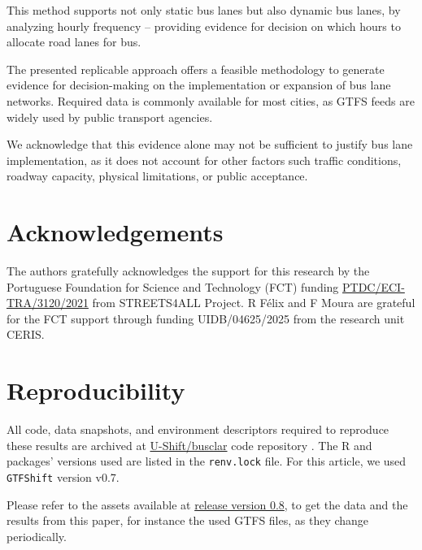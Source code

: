 \documentclass[
]{article}
\begin{document}
This method supports not only static bus lanes but also dynamic bus lanes, by analyzing hourly frequency -- providing evidence for decision on which hours to allocate road lanes for bus.

The presented replicable approach offers a feasible methodology to generate evidence for decision-making on the implementation or expansion of bus lane networks.
Required data is commonly available for most cities, as GTFS feeds are widely used by public transport agencies.

We acknowledge that this evidence alone may not be sufficient to justify bus lane implementation, as it does not account for other factors such traffic conditions, roadway capacity, physical limitations, or public acceptance.

\section*{Acknowledgements}\label{acknowledgements}

The authors gratefully acknowledges the support for this research by the Portuguese Foundation for Science and Technology (FCT) funding \href{https://doi.org/10.54499/PTDC/ECI-TRA/3120/2021}{PTDC/ECI-TRA/3120/2021} from STREETS4ALL Project.
R Félix and F Moura are grateful for the FCT support through funding UIDB/04625/2025 from the research unit CERIS.

\section*{Reproducibility}\label{reproducibility}

All code, data snapshots, and environment descriptors required to reproduce these results are archived at \href{https://github.com/U-Shift/busclar}{U-Shift/busclar} code repository \citep{busclar0825}.
The R and packages' versions used are listed in the \texttt{renv.lock} file.
For this article, we used \texttt{GTFShift} version v0.7.

Please refer to the assets available at \href{https://github.com/U-Shift/busclar/releases/tag/0.8}{release version 0.8}, to get the data and the results from this paper, for instance the used GTFS files, as they change periodically.

\renewcommand\refname{References}
  
\end{document}
